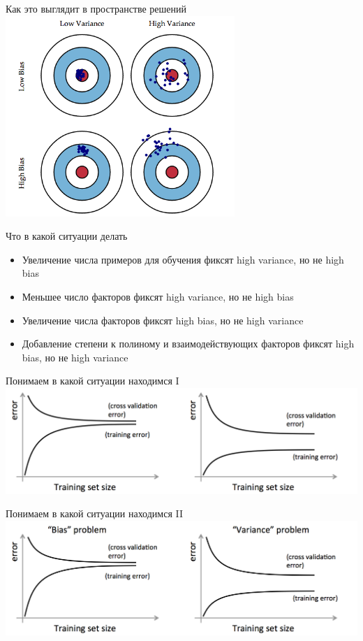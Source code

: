 \documentclass[14pt, fleqn, xcolor={dvipsnames, table}]{beamer}
\begin{document}
\begin{frame}{Как это выглядит в пространстве решений}
\centering
\includegraphics[width=0.65\textwidth]{bias_variance.png} 
\end{frame}

\begin{frame}{Что в какой ситуации делать}
\begin{itemize}
  \item Увеличение числа примеров для обучения фиксят high variance, но не high bias
  \item Меньшее число факторов фиксят high variance, но не high bias
  \item Увеличение числа факторов фиксят high bias, но не high variance
  \item Добавление степени к полиному и взаимодействующих факторов фиксят high bias, но не high variance
\end{itemize}
\end{frame}

\begin{frame}{Понимаем в какой ситуации находимся I}
\centering
\includegraphics[width=1.0\textwidth]{bias_error.png}
\end{frame}

\begin{frame}{Понимаем в какой ситуации находимся II}
\centering
\includegraphics[width=1.0\textwidth]{bias_error_2.png}
\end{frame}
\end{document}
